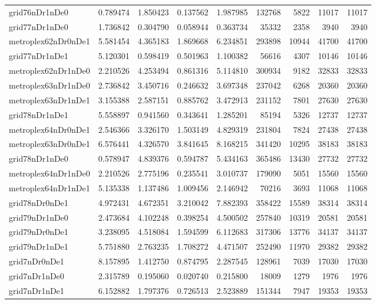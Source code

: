 \begin{longtable}{|l|r|r|r|r|r|r|r|r|}
grid76nDr1nDe0 & 0.789474 & 1.850423 & 0.137562 & 1.987985 & 132768 & 5822 & 11017 & 11017 \\
grid77nDr1nDe0 & 1.736842 & 0.304790 & 0.058944 & 0.363734 & 35332 & 2358 & 3940 & 3940 \\
metroplex62nDr0nDe1 & 5.581454 & 4.365183 & 1.869668 & 6.234851 & 293898 & 10944 & 41700 & 41700 \\
grid77nDr1nDe1 & 5.120301 & 0.598419 & 0.501963 & 1.100382 & 56616 & 4307 & 10146 & 10146 \\
metroplex62nDr1nDe0 & 2.210526 & 4.253494 & 0.861316 & 5.114810 & 300934 & 9182 & 32833 & 32833 \\
metroplex63nDr1nDe0 & 2.736842 & 3.450716 & 0.246632 & 3.697348 & 237042 & 6268 & 20360 & 20360 \\
metroplex63nDr1nDe1 & 3.155388 & 2.587151 & 0.885762 & 3.472913 & 231152 & 7801 & 27630 & 27630 \\
grid78nDr1nDe1 & 5.558897 & 0.941560 & 0.343641 & 1.285201 & 85194 & 5326 & 12737 & 12737 \\
metroplex64nDr0nDe1 & 2.546366 & 3.326170 & 1.503149 & 4.829319 & 231804 & 7824 & 27438 & 27438 \\
metroplex63nDr0nDe1 & 6.576441 & 4.326570 & 3.841645 & 8.168215 & 341420 & 10295 & 38183 & 38183 \\
grid78nDr1nDe0 & 0.578947 & 4.839376 & 0.594787 & 5.434163 & 365486 & 13430 & 27732 & 27732 \\
metroplex64nDr1nDe0 & 2.210526 & 2.775196 & 0.235541 & 3.010737 & 179090 & 5051 & 15560 & 15560 \\
metroplex64nDr1nDe1 & 5.135338 & 1.137486 & 1.009456 & 2.146942 & 70216 & 3693 & 11068 & 11068 \\
grid78nDr0nDe1 & 4.972431 & 4.672351 & 3.210042 & 7.882393 & 358422 & 15589 & 38314 & 38314 \\
grid79nDr1nDe0 & 2.473684 & 4.102248 & 0.398254 & 4.500502 & 257840 & 10319 & 20581 & 20581 \\
grid79nDr0nDe1 & 3.238095 & 4.518084 & 1.594599 & 6.112683 & 317306 & 13776 & 34137 & 34137 \\
grid79nDr1nDe1 & 5.751880 & 2.763235 & 1.708272 & 4.471507 & 252490 & 11970 & 29382 & 29382 \\
grid7nDr0nDe1 & 8.157895 & 1.412750 & 0.874795 & 2.287545 & 128961 & 7039 & 17030 & 17030 \\
grid7nDr1nDe0 & 2.315789 & 0.195060 & 0.020740 & 0.215800 & 18009 & 1279 & 1976 & 1976 \\
grid7nDr1nDe1 & 6.152882 & 1.797376 & 0.726513 & 2.523889 & 151344 & 7947 & 19353 & 19353 \\

\end{longtable}
